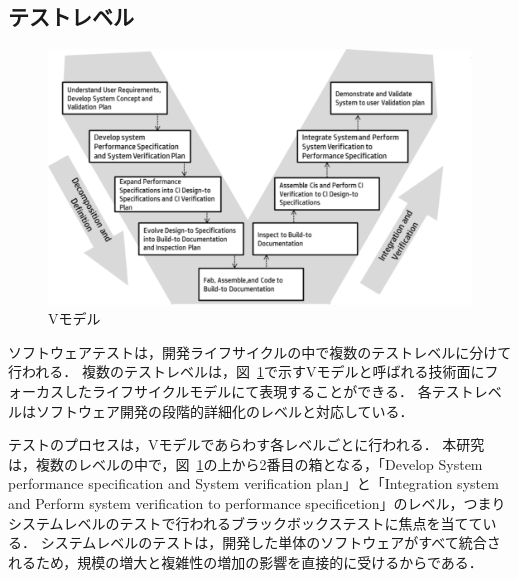 \subsection{テストレベル}

\begin{figure}[htbp]
  \begin{center}
  \includegraphics[width=12cm]{./image/D-2-Fig1.png}
  \caption{Vモデル}
  \label{fig:D-2-Fig1}
  \end{center}
\end{figure}
ソフトウェアテストは，開発ライフサイクルの中で複数のテストレベルに分けて行われる．
複数のテストレベルは，図~\ref{fig:D-2-Fig1}で示すVモデルと呼ばれる技術面にフォーカスしたライフサイクルモデルにて表現することができる\cite{forsberg1991}．
各テストレベルはソフトウェア開発の段階的詳細化のレベルと対応している．

テストのプロセスは，Vモデルであらわす各レベルごとに行われる．
本研究は，複数のレベルの中で，図~\ref{fig:D-2-Fig1}の上から2番目の箱となる，「Develop System performance specification and System verification plan」と「Integration system and Perform system verification to performance specificetion」のレベル，つまりシステムレベルのテストで行われるブラックボックステストに焦点を当てている．
システムレベルのテストは，開発した単体のソフトウェアがすべて統合されるため，規模の増大と複雑性の増加の影響を直接的に受けるからである．

